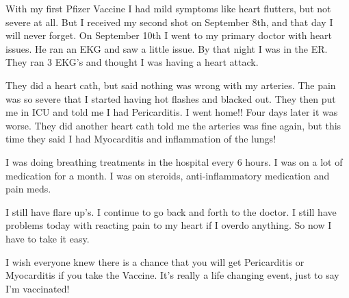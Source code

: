 With my first Pfizer Vaccine I had mild symptoms like heart flutters, but not
severe at all. But I received my second shot on September 8th, and that day I
will never forget. On September 10th I went to my primary doctor with heart
issues. He ran an EKG and saw a little issue. By that night I was in the
ER. They ran 3 EKG’s and thought I was having a heart attack.

They did a heart cath, but said nothing was wrong with my arteries. The pain was
so severe that I started having hot flashes and blacked out. They then put me in
ICU and told me I had Pericarditis. I went home!! Four days later it was
worse. They did another heart cath told me the arteries was fine again, but this
time they said I had Myocarditis and inflammation of the lungs!

I was doing breathing treatments in the hospital every 6 hours. I was on a lot
of medication for a month. I was on steroids, anti-inflammatory medication and
pain meds.

I still have flare up’s. I continue to go back and forth to the doctor. I still
have problems today with reacting pain to my heart if I overdo anything. So now
I have to take it easy.

I wish everyone knew there is a chance that you will get Pericarditis or
Myocarditis if you take the Vaccine. It’s really a life changing event, just to
say I’m vaccinated!
